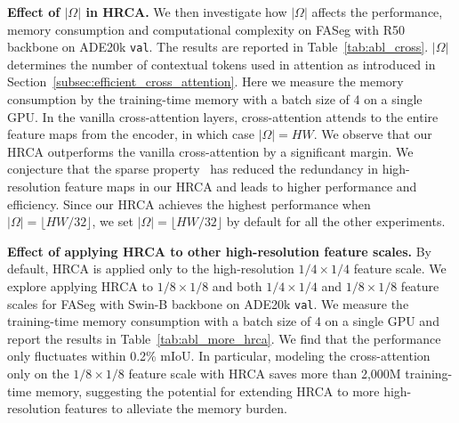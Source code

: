 \noindent\textbf{Effect of $|\Omega|$ in HRCA.} We then investigate how $|\Omega|$ affects the performance, memory consumption and computational complexity on FASeg with R50 backbone on ADE20k \texttt{val}. The results are reported in Table~\ref{tab:abl_cross}. $|\Omega|$ determines the number of contextual tokens used in attention as introduced in Section~\ref{subsec:efficient_cross_attention}. Here we measure the memory consumption by the training-time memory with a batch size of 4 on a single GPU. In the vanilla cross-attention layers, cross-attention attends to the entire feature maps from the encoder, in which case $|\Omega|=HW$. We observe that our HRCA outperforms the vanilla cross-attention by a significant margin.  We conjecture that the sparse property~\cite{frankle2018the,evci2020rigging} has reduced the redundancy in high-resolution feature maps in our HRCA and leads to higher performance and efficiency. Since our HRCA achieves the highest performance when $|\Omega|=\lfloor HW / 32 \rfloor$, we set $|\Omega|=\lfloor HW / 32 \rfloor$ by default for all the other experiments.


\begin{table}[tb!]
\centering
\caption{Effect of applying HRCA to other high-resolution feature scales for FASeg with Swin-B Backbone on ADE20K \texttt{val}~\cite{zhou2017scene} with 150 categories.}
\vspace{-0.5em}
\label{tab:abl_more_hrca}
\vspace{-2em}
\end{table}

\noindent\textbf{Effect of applying HRCA to other high-resolution feature scales.} By default, HRCA is applied only to the high-resolution $1/4\times1/4$ feature scale. We explore applying HRCA to $1/8\times1/8$ and both $1/4\times1/4$ and $1/8\times1/8$ feature scales for FASeg with Swin-B backbone on ADE20k \texttt{val}. We measure the training-time memory consumption with a batch size of 4 on
a single GPU and report the results in Table~\ref{tab:abl_more_hrca}. We find that the performance only fluctuates within 0.2\% mIoU. In particular, modeling the cross-attention only on the $1/8\times1/8$ feature scale with HRCA saves more than 2,000M training-time memory, suggesting the potential for extending HRCA to more high-resolution features to alleviate the memory burden.